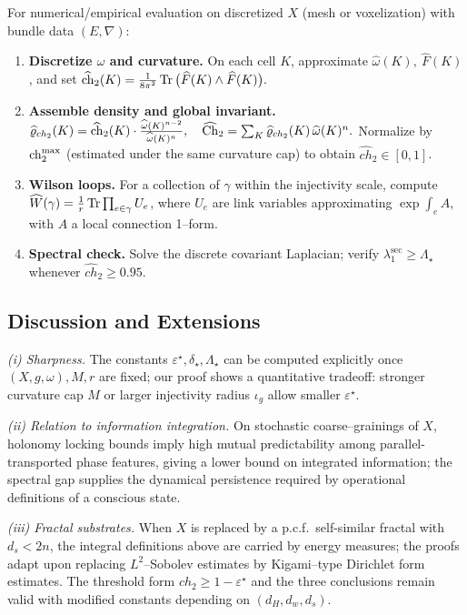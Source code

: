 For numerical/empirical evaluation on discretized $X$ (mesh or voxelization) with bundle data $(E,\nabla)$:

\begin{enumerate}
\item \textbf{Discretize $\omega$ and curvature.} On each cell $K$, approximate
$
\widehat{\omega}(K),\ \widehat{F}(K)
$,
and set
$
\widehat{\mathrm{ch}}_2(K)=\frac{1}{8\pi^2}\operatorname{Tr}\big(\widehat{F}(K)\wedge \widehat{F}(K)\big).
$
\item \textbf{Assemble density and global invariant.}
$
\widehat{\varrho}_{ch_2}(K)=\widehat{\mathrm{ch}}_2(K)\cdot \frac{\widehat{\omega}(K)^{n-2}}{\widehat{\omega}(K)^{n}},
\quad
\widehat{\mathrm{Ch}}_2=\sum_K \widehat{\varrho}_{ch_2}(K)\,\widehat{\omega}(K)^{n}.
$
Normalize by $\mathrm{ch}_2^{\max}$ (estimated under the same curvature cap) to obtain $\widehat{ch}_2\in[0,1]$.
\item \textbf{Wilson loops.} For a collection of $\gamma$ within the injectivity scale, compute
$
\widehat{W}(\gamma)=\frac{1}{r}\operatorname{Tr}\prod_{e\in\gamma}U_e
$,
where $U_e$ are link variables approximating $\exp\!\int_e A$, with $A$ a local connection 1--form.
\item \textbf{Spectral check.} Solve the discrete covariant Laplacian; verify $\lambda_1^\mathrm{sec}\ge \Lambda_\star$ whenever $\widehat{ch}_2\ge 0.95$.
\end{enumerate}

\subsection{Discussion and Extensions}

\noindent
\emph{(i) Sharpness.}
The constants $\varepsilon^\star,\delta_\star,\Lambda_\star$ can be computed explicitly once $(X,g,\omega),M,r$ are fixed; our proof shows a quantitative tradeoff:
stronger curvature cap $M$ or larger injectivity radius $\iota_g$ allow smaller $\varepsilon^\star$.

\smallskip
\noindent
\emph{(ii) Relation to information integration.}
On stochastic coarse--grainings of $X$, holonomy locking bounds imply high mutual predictability among parallel-transported phase features, giving a lower bound on integrated information; the spectral gap supplies the dynamical persistence required by operational definitions of a conscious state.

\smallskip
\noindent
\emph{(iii) Fractal substrates.}
When $X$ is replaced by a p.c.f.\ self-similar fractal with $d_s<2n$,
the integral definitions above are carried by energy measures; the proofs adapt upon replacing $L^2$--Sobolev estimates by Kigami--type Dirichlet form estimates. The threshold form $ch_2\ge 1-\varepsilon^\star$ and the three conclusions remain valid with modified constants depending on $(d_H,d_w,d_s)$.

